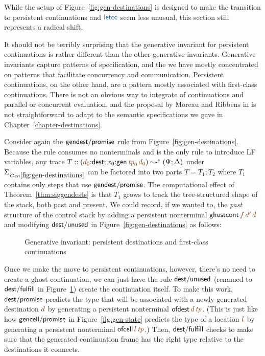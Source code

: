 \smallskip
{}
\smallskip

\noindent
While the setup of Figure~\ref{fig:gen-destinations} is designed to
make the transition to persistent continuations and $\obj{\sf letcc}$
seem less unusual, this section still represents a radical shift.  

It should not be terribly surprising that the generative invariant for
persistent continuations is rather different than the other generative
invariants. Generative invariants capture patterns of specification,
and the we have mostly concentrated on patterns that facilitate
concurrency and communication. Persistent continuations, on the other
hand, are a pattern mostly associated with first-class
continuations. There is not an obvious way to integrate of
continuations and parallel or concurrent evaluation, and the proposal
by Moreau and Ribbens in \cite{moreau96semantics} is not
straightforward to adapt to the semantic specifications we gave in
Chapter~\ref{chapter-destinations}.

Consider again the ${\sf gendest/promise}$ rule from
Figure~\ref{fig:gen-destinations}. Because the rule consumes no
nonterminals and is the only rule to introduce LF variables, any trace
$T :: \left(\lf{d_0}{:}{\sf dest}; x_0{:}{\sf gen}\,\lf{{\it
      tp}_0}\,\lf{d_0}\right) \leadsto^* {(\Psi;
  \Delta)}{}$ under $\siggendests$ can be factored into two parts $T =
T_1; T_2$ where $T_1$ contains only steps that use ${\sf
  gendest/promise}$. The computational effect of
Theorem~\ref{thm:siggendests} is that $T_1$ grows to track the
tree-structured shape of the stack, both past and present. We could
record, if we wanted to, the {\it past} structure of the control stack
by adding a persistent nonterminal ${\sf
  ghostcont}\,\lf{f}\,\lf{d'}\,\lf{d}$ and modifying ${\sf dest/unused}$
in Figure~\ref{fig:gen-destinations} as follows:

\smallskip
{}
\smallskip

\begin{figure}[tp]
\caption{Generative invariant: persistent destinations and first-class
  continuations}
\label{fig:gen-letcc2} 
\end{figure}

Once we make the move to persistent continuations, however, there's no
need to create a ghost continuation, we can just have the rule ${\sf
  dest/unused}$ (renamed to ${\sf dest/fulfill}$ in
Figure~\ref{fig:gen-letcc2}) create the continuation itself.  To make
this work, ${\sf dest/promise}$ predicts the type that will be
associated with a newly-generated destination $\lf{d}$ by generating a
persistent nonterminal ${\sf ofdest}\,\lf{d}\,\lf{{\it tp}}$. (This is
just like how ${\sf gencell/promise}$ in Figure~\ref{fig:gen-state}
predicts the type of a location $\lf{l}$ by generating a persistent
nonterminal ${\sf ofcell}\,\lf{l}\,\lf{{\it tp}}$.) Then, ${\sf
  dest/fulfill}$ checks to make sure that the generated continuation
frame has the right type relative to the destinations it connects.

